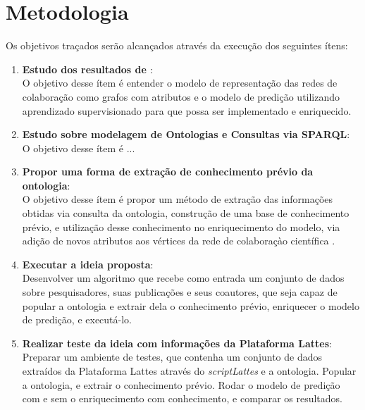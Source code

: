 \section{Metodologia}
\label{sec:metodologia}

Os objetivos traçados serão alcançados através da execução dos seguintes ítens:

\begin{enumerate}
    \item \textbf{Estudo dos resultados de \citet{Cervantes2014}}: \\
      O objetivo desse ítem é entender o modelo de representação das redes de colaboração como grafos com atributos e o modelo de predição utilizando aprendizado supervisionado para que possa ser implementado e enriquecido.
    \item \textbf{Estudo sobre modelagem de Ontologias e Consultas via SPARQL}: \\
      O objetivo desse ítem é  ...
    \item \textbf{Propor uma forma de extração de conhecimento prévio da ontologia}: \\
      O objetivo desse ítem é propor um método de extração das informações obtidas via consulta da ontologia, construção de uma base de conhecimento prévio, e utilização desse conhecimento no enriquecimento do modelo, via adição de novos atributos aos vértices da rede de colaboraçào científica .
    \item \textbf{Executar a ideia proposta}: \\
      Desenvolver um algoritmo que recebe como entrada um conjunto de dados sobre pesquisadores, suas publicações e seus coautores, que seja capaz de popular a ontologia e extrair dela o conhecimento prévio, enriquecer o modelo de predição, e executá-lo. %
    \item \textbf{Realizar teste da ideia com informações da Plataforma Lattes}: \\
      Preparar um ambiente de testes, que contenha um conjunto de dados extraídos da Plataforma Lattes através do \textit{scriptLattes} e a ontologia. Popular a ontologia, e extrair o conhecimento prévio. Rodar o modelo de predição com e sem o enriquecimento com conhecimento, e comparar os resultados. %
\end{enumerate}


